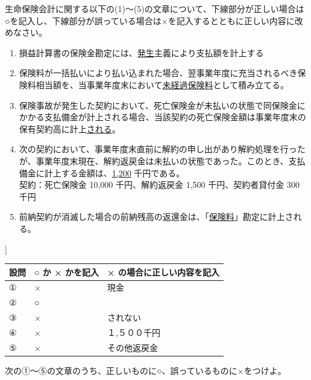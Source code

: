 \documentclass[report,gutter=10mm,fore-edge=10mm,uplatex,dvipdfmx]{jlreq}
\begin{document}

生命保険会計に関する以下の(1)～(5)の文章について、下線部分が正しい場合は○を記入し、下線部分が誤っている場合は×を記入するとともに正しい内容に改めなさい。

\begin{enumerate} [(1)]
 \item  損益計算書の保険金勘定には、\underline{発生}主義により支払額を計上する
 \item  保険料が一括払いにより払い込まれた場合、翌事業年度に充当されるべき保険料相当額を、当事業年度末において\underline{未経過保険料}として積み立てる。
 \item  保険事故が発生した契約において、死亡保険金が未払いの状態で同保険金にかかる支払備金が計上される場合、当該契約の死亡保険金額は事業年度末の保有契約高に計上\underline{される}。
 \item 
 次の契約において、事業年度末直前に解約の申し出があり解約処理を行ったが、事業年度末現在、解約返戻金は未払いの状態であった。このとき、支払備金に計上する金額は、\underline{1,200} 千円である。\\ 
       契約：死亡保険金 10,000 千円、解約返戻金 1,500 千円、契約者貸付金 300 千円
 \item  前納契約が消滅した場合の前納残高の返還金は、「\underline{保険料}」勘定に計上される。
\end{enumerate}
]


\begin{longtable}[]{@{}lll@{}}
\toprule
設問 & ○ か × かを記入 & × の場合に正しい内容を記入\tabularnewline
\midrule
\endhead
① & × & 現金\tabularnewline
② & ○ &\tabularnewline
③ & × & されない\tabularnewline
④ & × & １,５００千円\tabularnewline
⑤ & × & その他返戻金\tabularnewline
\bottomrule
\end{longtable}


次の①～⑤の文章のうち、正しいものに○、誤っているものに×をつけよ。
\end{document}

